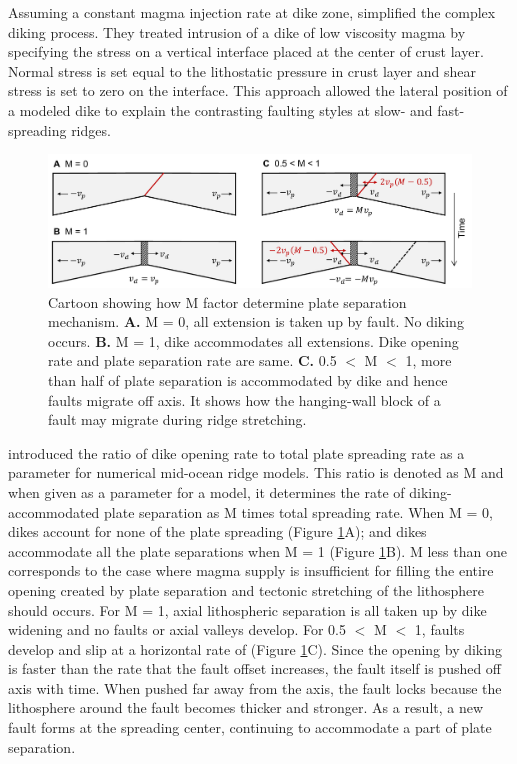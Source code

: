 \documentclass[letterpaper,12pt,notitle]{memphisthesis}                     %
\begin{document}
Assuming a constant magma injection rate at dike zone, \citet{Buck1998} simplified the complex diking process. They treated intrusion of a dike of low viscosity magma by specifying the stress on a vertical interface placed at the center of crust layer. Normal stress is set equal to the lithostatic pressure in crust layer and shear stress is set to zero on the interface.
This approach allowed the lateral position of a modeled dike to explain the contrasting faulting styles at slow- and fast-spreading ridges.

\begin{figure}[!htb]
    \centering
    \includegraphics[width=0.99\linewidth]{./figs/mfactor.pdf}
    \caption{Cartoon showing how M factor determine plate separation mechanism. \textbf{A.} M = 0, all extension is taken up by fault. No diking occurs. \textbf{B.} M = 1, dike accommodates all extensions. Dike opening rate and plate separation rate are same. \textbf{C.} 0.5 $<$ M $<$ 1, more than half of plate separation is accommodated by dike and hence faults migrate off axis. It shows how the hanging-wall block of a fault may migrate during ridge stretching.}
    \label{fig:mcartoon}
\end{figure}

\citet{Buck2005} introduced the ratio of dike opening rate to total plate spreading rate as a parameter for numerical mid-ocean ridge models. This ratio is denoted as M and when given as a parameter for a model, it determines the rate of diking-accommodated plate separation as M times total spreading rate. When M = 0, dikes account for none of the plate spreading (Figure \ref{fig:mcartoon}A); and dikes accommodate all the plate separations when M = 1 (Figure \ref{fig:mcartoon}B). M less than one corresponds to the case where magma supply is insufficient for filling the entire opening created by plate separation and tectonic stretching of the lithosphere should occurs. For M = 1, axial lithospheric separation is all taken up by dike widening and no faults or axial valleys develop.  For 0.5 $<$ M $<$ 1, faults develop and slip at a horizontal rate of  (Figure \ref{fig:mcartoon}C). Since the opening by diking is faster than the rate that the fault offset increases, the fault itself is pushed off axis with time. When pushed far away from the axis, the fault locks because the lithosphere around the fault becomes thicker and stronger. As a result, a new fault forms at the spreading center, continuing to accommodate a part of plate separation.  %
\end{document}
